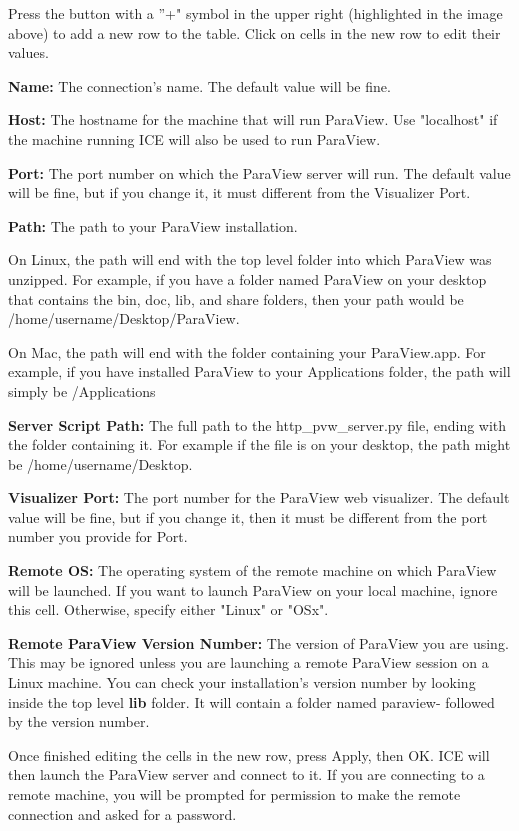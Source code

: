 Press the button with a ''+" symbol in the upper right (highlighted in the image
above) to add a new row to the table. Click on cells in the new row to edit
their values. 

\textbf{Name:} The connection's name. The default value will be fine.

\textbf{Host:} The hostname for the machine that will run ParaView. Use "localhost" if the machine running ICE will also be used to run ParaView.

\textbf{Port:} The port number on which the ParaView server will run. The default value will be fine, but if you change it, it must different from the Visualizer Port.

\textbf{Path:} The path to your ParaView installation. 

On Linux, the path will end with the top level folder into which ParaView was unzipped. For example, if you have a folder named ParaView on your desktop that contains the bin, doc, lib, and share folders, then your path would be /home/username/Desktop/ParaView. 

On Mac, the path will end with the folder containing your ParaView.app. For example, if you have installed ParaView to your Applications folder, the path will simply be /Applications

\textbf{Server Script Path:} The full path to the http\_pvw\_server.py file,
ending with the folder containing it. For example if the file is on your desktop, the path might be /home/username/Desktop.

\textbf{Visualizer Port:} The port number for the ParaView web visualizer. The default value will be fine, but if you change it, then it must be different from the port number you provide for Port.

\textbf{Remote OS:} The operating system of the remote machine on which ParaView will be launched. If you want to launch ParaView on your local machine, ignore this cell. Otherwise, specify either "Linux" or "OSx".

\textbf{Remote ParaView Version Number:} The version of ParaView you are using. This may be ignored unless you are launching a remote ParaView session on a Linux machine. You can check your installation's version number by looking inside the top level \textbf{lib} folder. It will contain a folder named paraview- followed by the version number.

Once finished editing the cells in the new row, press Apply, then OK. ICE will
then launch the ParaView server and connect to it. If you are connecting to a remote machine, you will be prompted for permission to make the remote connection and asked for a password.

